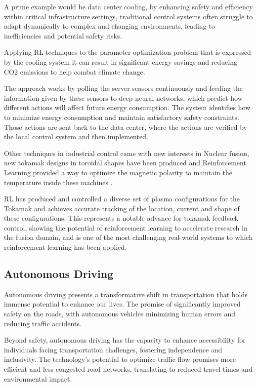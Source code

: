 A prime example would be data center cooling, by enhancing safety and efficiency within critical infrastructure settings, traditional control systems often struggle to adapt dynamically to complex and changing environments, leading to inefficiencies and potential safety risks.

Applying RL techniques to the parameter optimization problem that is expressed by the cooling system it can result in significant energy savings and reducing CO2 emissions to help combat climate change.

The approach works by polling the server sensors continuously and feeding the information given by these sensors to deep neural networks, which predict how different actions will affect future energy consumption. The system identifies how to minimize energy consumption and maintain satisfactory safety constraints. Those actions are sent back to the data center, where the actions are verified by the local control system and then implemented.

Other techniques in industrial control came with new interests in Nuclear fusion, new tokamak designs in toroidal shapes have been produced and Reinforcement Learning provided a way to optimize the magnetic polarity to maintain the temperature inside these machines \cite{degrave2022magnetic}.

RL has produced and controlled a diverse set of plasma configurations for the Tokamak and achieves accurate tracking of the location, current and shape of these configurations. This represents a notable advance for tokamak feedback control, showing the potential of reinforcement learning to accelerate research in the fusion domain, and is one of the most challenging real-world systems to which reinforcement learning has been applied.

\subsection*{Autonomous Driving}
Autonomous driving presents a transformative shift in transportation that holds immense potential to enhance our lives. The promise of significantly improved safety on the roads, with autonomous vehicles minimizing human errors and reducing traffic accidents. 

Beyond safety, autonomous driving has the capacity to enhance accessibility for individuals facing transportation challenges, fostering independence and inclusivity. The technology's potential to optimize traffic flow promises more efficient and less congested road networks, translating to reduced travel times and environmental impact. 

